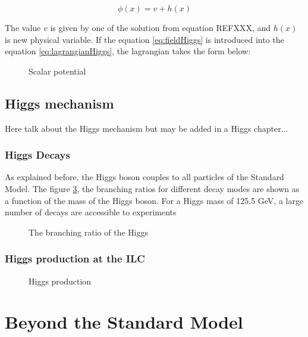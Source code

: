     \begin{equation}
      \phi(x) = v + h(x)
      \label{eq:fieldHiggs}
    \end{equation}

    The value $v$ is given by one of the solution from equation REFXXX, and $h(x)$ is new physical variable.
    If the equation \ref{eq:fieldHiggs} is introduced into the equation \ref{eq:lagrangianHiggs}, the lagrangian takes the form below:

    \begin{figure}[h]
    \centering
    \caption{Scalar potential}
    \label{fig:scalarPotential}
    \end{figure}

    \subsection{Higgs mechanism}

    Here talk about the Higgs mechanism but may be added in a Higgs chapter...


   \subsubsection{Higgs Decays}

   As explained before, the Higgs boson couples to all particles of the Standard Model.
   The figure \ref{fig:higgsBR}, the branching ratios for different decay modes are shown as a function of the mass of the Higgs boson.
   For a Higgs mass of 125.5 GeV, a large number of decays are accessible to experiments

    \begin{figure}[h]
    \centering
    \caption{The branching ratio of the Higgs}
    \label{fig:higgsBR}
    \end{figure}

   \subsubsection{Higgs production at the ILC}
    
    \begin{figure}[h]
    \centering
    \caption{Higgs production}
    \label{fig:higgsBR}
    \end{figure}
      
  \section{Beyond the Standard Model}

